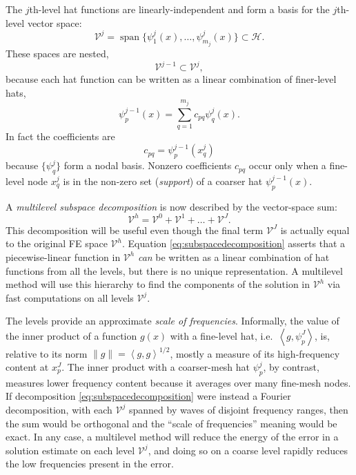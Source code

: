 \documentclass[letterpaper,final,12pt,reqno]{amsart}
\theoremstyle{claim}
\newcommand{\ip}[2]{\left<#1,#2\right>}
\numberwithin{equation}{section}
\numberwithin{figure}{section}
\numberwithin{table}{section}
\numberwithin{theorem}{section}
\begin{document}
The $j$th-level hat functions are linearly-independent and form a basis for the $j$th-level vector space:
\begin{equation}
  \mathcal{V}^j = \operatorname{span}\{\psi_1^j(x),\dots,\psi_{m_j}^j(x)\} \subset \mathcal{H}.  \label{eq:definevk}
\end{equation}
These spaces are nested,
\begin{equation}
  \mathcal{V}^{j-1} \subset \mathcal{V}^j,  \label{eq:nestedvk}
\end{equation}
because each hat function can be written as a linear combination of finer-level hats,
\begin{equation}
   \psi_p^{j-1}(x) = \sum_{q=1}^{m_j} c_{pq} \psi_q^j(x). \label{eq:hatcombination}
\end{equation}
In fact the coefficients are
\begin{equation}
  c_{pq} = \psi_p^{j-1}(x_q^j) \label{eq:nodalcoefficients}
\end{equation}
because $\{\psi_q^j\}$ form a nodal basis.  Nonzero coefficients $c_{pq}$ occur only when a fine-level node $x_q^j$ is in the non-zero set (\emph{support}) of a coarser hat $\psi_p^{j-1}(x)$.

A \emph{multilevel subspace decomposition} is now described by the vector-space sum:
\begin{equation}
  \mathcal{V}^h = \mathcal{V}^0 + \mathcal{V}^1 + \dots + \mathcal{V}^J. \label{eq:subspacedecomposition}
\end{equation}
This decomposition will be useful even though the final term $\mathcal{V}^J$ is actually equal to the original FE space $\mathcal{V}^h$.  Equation \eqref{eq:subspacedecomposition} asserts that a piecewise-linear function in $\mathcal{V}^h$ \emph{can} be written as a linear combination of hat functions from all the levels, but there is no unique representation.  A multilevel method will use this hierarchy to find the components of the solution in $\mathcal{V}^h$ via fast computations on all levels $\mathcal{V}^j$.

The levels provide an approximate \emph{scale of frequencies}.  Informally, the value of the inner product of a function $g(x)$ with a fine-level hat, i.e.~$\ip{g}{\psi_p^J}$, is, relative to its norm $\|g\| = \ip{g}{g}^{1/2}$, mostly a measure of its high-frequency content at $x_p^J$.  The inner product with a coarser-mesh hat $\psi_p^j$, by contrast, measures lower frequency content because it averages over many fine-mesh nodes.  If decomposition \eqref{eq:subspacedecomposition} were instead a Fourier decomposition, with each $\mathcal{V}^j$ spanned by waves of disjoint frequency ranges, then the sum would be orthogonal and the ``scale of frequencies'' meaning would be exact.  In any case, a multilevel method will reduce the energy of the error in a solution estimate on each level $\mathcal{V}^j$, and doing so on a coarse level rapidly reduces the low frequencies present in the error.
\end{document}
